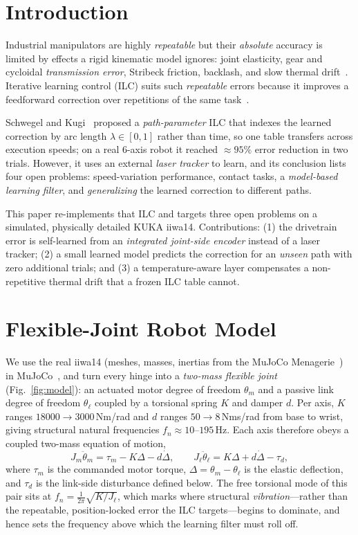 \documentclass[10pt,twocolumn]{article}
\begin{document}
\section{Introduction}
Industrial manipulators are highly \emph{repeatable} but their \emph{absolute}
accuracy is limited by effects a rigid kinematic model ignores: joint elasticity,
gear and cycloidal \emph{transmission error}, Stribeck friction, backlash, and
slow thermal drift~\cite{schwegel2024,litak2003}. Iterative learning control
(ILC) suits such \emph{repeatable} errors because it improves a feedforward
correction over repetitions of the same task~\cite{bristow2006}.

Schwegel and Kugi~\cite{schwegel2024} proposed a \emph{path-parameter} ILC that
indexes the learned correction by arc length $\lambda\in[0,1]$ rather than time,
so one table transfers across execution speeds; on a real 6-axis robot it reached
${\approx}95\%$ error reduction in two trials. However, it uses an external
\emph{laser tracker} to learn, and its conclusion lists four open problems:
speed-variation performance, contact tasks, a \emph{model-based learning filter},
and \emph{generalizing} the learned correction to different paths.

This paper re-implements that ILC and targets three open problems on a simulated,
physically detailed KUKA iiwa14. Contributions: (1) the drivetrain error is
self-learned from an \emph{integrated joint-side encoder} instead of a laser
tracker; (2) a small learned model predicts the correction for an \emph{unseen}
path with zero additional trials; and (3) a temperature-aware layer compensates a
non-repetitive thermal drift that a frozen ILC table cannot.

\section{Flexible-Joint Robot Model}\label{sec:model}
We use the real iiwa14 (meshes, masses, inertias from the MuJoCo
Menagerie~\cite{menagerie}) in MuJoCo~\cite{mujoco}, and turn every hinge into a
\emph{two-mass flexible joint}~\cite{spong1987} (Fig.~\ref{fig:model}): an actuated
motor degree of freedom $\theta_m$ and a passive link degree of freedom
$\theta_\ell$ coupled by a torsional spring $K$ and damper $d$. Per axis, $K$ ranges $18000{\to}3000$\,Nm/rad
and $d$ ranges $50{\to}8$\,Nms/rad from base to wrist, giving structural natural
frequencies $f_n\approx 10$--$195$\,Hz. Each axis therefore obeys a coupled
two-mass equation of motion,
\begin{equation}
J_m\ddot\theta_m = \tau_m - K\Delta - d\dot\Delta,\qquad
J_\ell\ddot\theta_\ell = K\Delta + d\dot\Delta - \tau_d,
\label{eq:eom}
\end{equation}
where $\tau_m$ is the commanded motor torque, $\Delta=\theta_m-\theta_\ell$ is the
elastic deflection, and $\tau_d$ is the link-side disturbance defined below. The
free torsional mode of this pair sits at $f_n=\tfrac{1}{2\pi}\sqrt{K/J_\ell}$,
which marks where structural \emph{vibration}---rather than the repeatable,
position-locked error the ILC targets---begins to dominate, and hence sets the
frequency above which the learning filter must roll off.
\end{document}
